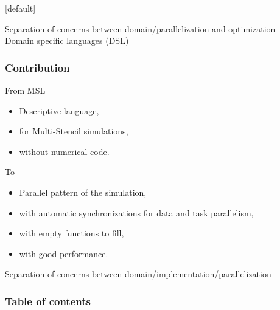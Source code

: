 \documentclass{beamer}
\makeatletter
\newenvironment{withoutheadline}{
        \setbeamertemplate{headline}[default]
        \def\beamer@entrycode{\vspace*{-\headheight}}
    }{}
\makeatother
\begin{document}
\begin{withoutheadline}
\begin{frame}
\begin{center}
Separation of concerns between domain/parallelization and optimization\\
Domain specific languages (DSL)\\
\medskip
{}
\end{center}
\end{frame}
\begin{frame}
\frametitle{Contribution}
\begin{block}{From MSL}
\begin{itemize}
\item Descriptive language,
\item for Multi-Stencil simulations,
\item without numerical code.
\end{itemize}
\end{block}

\begin{block}{To}
\begin{itemize}
\item Parallel pattern of the simulation,
\item with automatic synchronizations for data and task parallelism,
\item with empty functions to fill,
\item with good performance.
\end{itemize}
\end{block}

Separation of concerns between domain/implementation/parallelization

\end{frame}


\begin{frame}
\frametitle{Table of contents}
    \tableofcontents[hideallsubsections]
\end{frame}

\end{withoutheadline}

\end{document}
